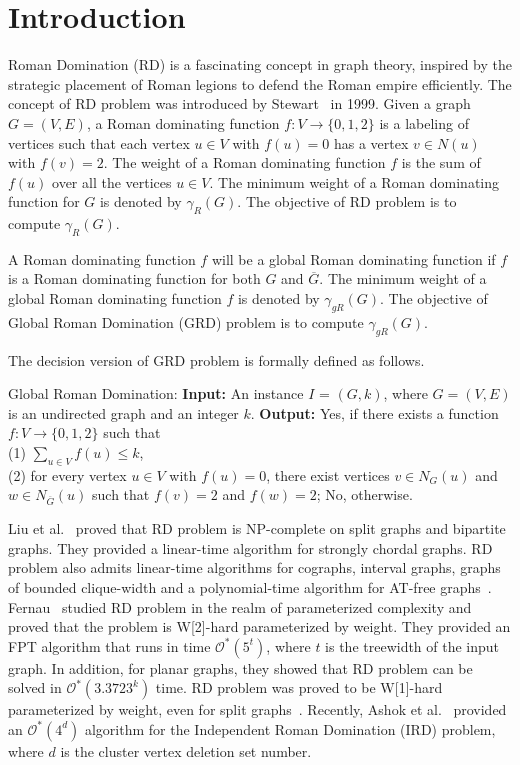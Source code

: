 \documentclass[preprint,12pt]{elsarticle}
\newcommand{\grd}{{\sc Global Roman Domination}}
\newcommand{\ird}{{\sc Independent Roman Domination}}
\newcommand{\rd}{{\sc Roman Domination}}
\begin{document}
\section{Introduction}\rd{} (RD) is a fascinating concept in graph theory, inspired by the strategic placement of Roman legions to defend the Roman empire efficiently. The concept of RD problem was introduced by Stewart~\cite{stewart1999defend} in 1999. Given a graph $G = (V, E)$, a Roman dominating function $f: V \rightarrow{} \{0 ,1, 2\}$ is a labeling of vertices such that each vertex $u \in V$ with $f(u) = 0$ has a vertex $v \in N(u)$ with $f(v) =2$. The weight of a Roman dominating function $f$ is the sum of $f(u)$ over all the vertices $u \in V$. The minimum weight of a Roman dominating function for $G$ is denoted by $\gamma_{R}(G)$. The objective of RD problem is to compute $\gamma_{R}(G)$.

A Roman dominating function $f$ will be a global Roman dominating function if $f$ is a Roman dominating function for both $G$ and $\overline{G}$. The minimum weight of a global Roman dominating function $f$ is denoted by $\gamma_{gR}(G)$. The objective of \grd{} (GRD) problem is to compute $\gamma_{gR}(G)$.

The decision version of GRD problem is formally defined as follows.
\begin{tcolorbox}
{
\grd{}: \newline
\textbf{Input:} An instance $I$ = $(G, k)$, where $G=(V,E)$ is an undirected graph and an integer $k$.\newline
\textbf{Output:} Yes, if there exists a function $f: V \rightarrow{} \{0,1,2\}$ such that \\
(1) $\sum_{u \in V} f(u) \leq k$, \\
(2) for every vertex $u \in V$ with $f(u) = 0$, there exist vertices $v \in N_G(u)$ and $w \in N_{\overline{G}}(u)$ such that $f(v) = 2$ and $f(w) = 2$; No, otherwise.
}
\end{tcolorbox}
Liu et al.~\cite{liu2013roman} proved that RD problem is NP-complete on split graphs and bipartite graphs. They provided a linear-time algorithm for strongly chordal graphs. RD problem also admits linear-time algorithms for cographs, interval graphs, graphs of bounded clique-width and a polynomial-time algorithm for AT-free graphs~\cite{liedloff2008efficient}. Fernau~\cite{henning} studied RD problem in the realm of parameterized complexity and proved that the problem is W[2]-hard parameterized by weight. They provided an FPT algorithm that runs in time $\mathcal{O}^*(5^t)$, where $t$ is the treewidth of the input graph. In addition, for planar graphs, they showed that RD problem can be solved in $\mathcal{O}^*(3.3723^k)$ time. RD problem was proved to be W[1]-hard parameterized by weight, even for split graphs~\cite{mohanapriya2023roman}. Recently, Ashok et al.~\cite{ashok2024independent} provided an $\mathcal{O}^*(4^d)$ algorithm for the \ird{} (IRD) problem, where $d$ is the cluster vertex deletion set number. 
\end{document}
